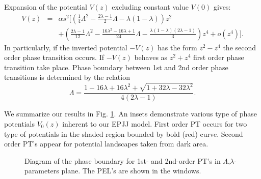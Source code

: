 \documentclass[aps, pre, preprint, groupedaddress, superscriptaddress, showkeys, showpacs] {revtex4-1}
\begin{document}
Expansion of the potential $V(z)$ excluding constant value $V(0)$ gives:
%
\begin{equation}
\begin{array}{lcl}
V(z) & = & \alpha s^2 \Big[ \left( \frac{1}{4} \Lambda^2  - \frac{2\lambda - 1}{2} \Lambda - \lambda (1 - \lambda) \right) z^2 \\
&& + \left( \frac{2\lambda - 1}{12} \Lambda^2 - \frac{16\lambda^2 - 16\lambda + 1}{24} \Lambda - \frac{\lambda (1 - \lambda) (2\lambda - 1)}{3} \right) z^4 + o(z^4) \Big].
\end{array}
\label{eq:potential_teylor}
\end{equation}
%
In particularly, if the inverted potential $-V(z)$ has the form $z^2 - z^4$ the second order phase transition occurs.
If $-V(z)$ behaves as $z^2 + z^4$ first order phase transition take place.
Phase boundary between 1st and 2nd order phase transitions is determined by the relation
%
\begin{equation}
\Lambda = \frac{1 - 16\lambda + 16\lambda^2 + \sqrt{1 + 32\lambda - 32\lambda^2}}{4(2\lambda - 1)}.
\label{eq:order_border}
\end{equation}
%

We summarize our results in Fig. \ref{pic:phase_boundary_combined}. An insets demonstrate various type of  phase potentials $V_0(z)$ inherent to our EPJJ model. First order PT occurs for two type of potentials in the shaded region bounded by bold  (red) curve.  Second order PT's appear for potential landscapes taken from  dark area. 
%
\begin{figure}[ht]
\caption{Diagram of the phase boundary for  1st- and 2nd-order  PT's in $\Lambda$,$\lambda$-parameters plane. The PEL's are shown in the windows. \label{pic:phase_boundary_combined}}
\end{figure}
%
\end{document}
